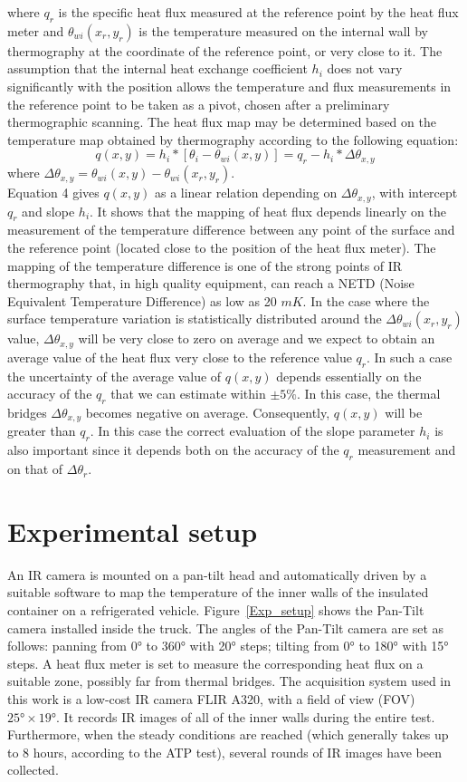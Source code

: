 \documentclass{tQRT2e}
\begin{document}
where $ q_r $ is the specific heat flux measured at the reference point by the heat flux meter and $ \theta_{wi}(x_r,y_r) $ is the temperature measured on the internal wall by thermography at the coordinate of the reference point, or very close to it. The assumption that the internal heat exchange coefficient $ h_i $ does not vary significantly with the position allows the temperature and flux measurements in the reference point to be taken as a pivot, chosen after a preliminary thermographic scanning. The heat flux map may be determined based on the temperature map obtained by thermography according to the following equation:
\begin{equation}
q(x,y)=h_i*[\theta_i-\theta_{wi} (x,y)]=q_r-h_i*\Delta \theta_{x,y}
\end{equation}
where $\Delta \theta_{x,y}=\theta_{wi} (x,y)- \theta_{wi} (x_r,y_r) $.\\
Equation 4 gives $ q(x,y) $ as a linear relation depending on  $ \Delta \theta_{x,y} $, with intercept $ q_r $ and slope $ h_i $. It shows that the mapping of heat flux depends linearly on the measurement of the temperature difference between any point of the surface and the reference point (located close to the position of the heat flux meter). The mapping of the temperature difference is one of the strong points of IR thermography that, in high quality equipment, can reach a NETD (Noise Equivalent Temperature Difference) as low as 20 $ mK $. In the case where the surface temperature variation is statistically distributed around the $ \Delta \theta_{wi}(x_r,y_r) $ value, $ \Delta \theta_{x,y} $ will be very close to zero on average and we expect to obtain an average value of the heat flux very close to the reference value $ q_r $. In such a case the uncertainty of the average value of $ q(x,y) $ depends essentially on the accuracy of the $ q_r $ that we can estimate within $ ± 5\% $. In this case, the thermal bridges $ \Delta \theta_{x,y}$ becomes negative on average. Consequently, $ q(x,y) $  will be greater than $ q_r $. In this case the correct evaluation of the slope parameter $ h_i $ is also important since it depends both on the accuracy of the $ q_r $ measurement and on that of $ \Delta \theta_{r} $.

\section{Experimental setup}
An IR camera is mounted on a pan-tilt head and automatically driven by a suitable software to map the temperature of the inner walls of the insulated container on a refrigerated vehicle. Figure~\ref{Exp_setup} shows the Pan-Tilt camera installed inside the truck. The angles of the Pan-Tilt camera are set as follows: panning from 0° to 360° with 20° steps; tilting from 0° to 180° with 15° steps. A heat flux meter is set to measure the corresponding heat flux on a suitable zone, possibly far from thermal bridges. The acquisition system used in this work is a low-cost IR camera FLIR A320, with a field of view (FOV) $ 25°×19° $. It records IR images of all of the inner walls during the entire test. Furthermore, when the steady conditions are reached (which generally takes up to 8 hours, according to the ATP test), several rounds of IR images have been collected.
\end{document}
